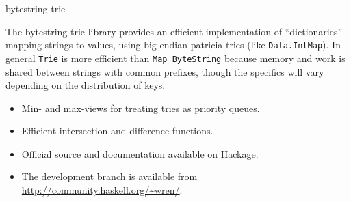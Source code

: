 \begin{hcarentry}{bytestring-trie}
\makeheader

The bytestring-trie library provides an efficient implementation of ``dictionaries'' mapping strings to values, using big-endian patricia tries (like \texttt{Data.IntMap}). In general \texttt{Trie} is more efficient than \texttt{Map ByteString} because memory and work is shared between strings with common prefixes, though the specifics will vary depending on the distribution of keys.

\FuturePlans
\begin{itemize}
\item Min- and max-views for treating tries as priority queues.
\item Efficient intersection and difference functions.
\end{itemize}

\FurtherReading
\begin{itemize}
\item Official source and documentation available on Hackage.
\item The development branch is available from \url{http://community.haskell.org/~wren/}.
\end{itemize}
\end{hcarentry}
